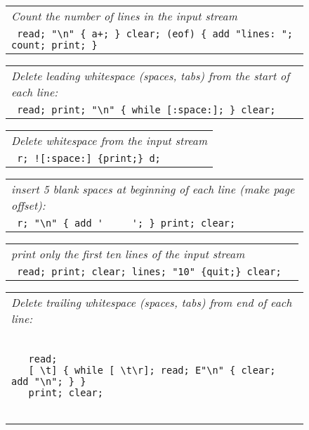 \documentclass[a4paper,12pt]{article}
\begin{document}
 \begin{figure}
 \begin{tabular}{ l }
 \emph{ Count the number of lines in the input stream } \\ 
 \verb| read; "\n" { a+; } clear; (eof) { add "lines: "; count; print; } |
 \end{tabular} 
 \end{figure}
 \begin{figure}
 \begin{tabular}{ l }
 \emph{ Delete leading whitespace (spaces, tabs) from the start of each line:  } \\ 
 \verb| read; print; "\n" { while [:space:]; } clear;  |
 \end{tabular} 
 \end{figure}
 \begin{figure}
 \begin{tabular}{ l }
 \emph{ Delete whitespace from the input stream } \\ 
 \verb| r; ![:space:] {print;} d; |
 \end{tabular} 
 \end{figure}
 \begin{figure}
 \begin{tabular}{ l }
 \emph{ insert 5 blank spaces at beginning of each line (make page offset): } \\ 
 \verb| r; "\n" { add '     '; } print; clear; |
 \end{tabular} 
 \end{figure}
 \begin{figure}
 \begin{tabular}{ l }
 \emph{ print only the first ten lines of the input stream } \\ 
 \verb| read; print; clear; lines; "10" {quit;} clear;  |
 \end{tabular} 
 \end{figure}
 \begin{figure}
 \begin{tabular}{ l }
 \emph{ Delete trailing whitespace (spaces, tabs) from end of each line:  } \\ 
 \begin{lstlisting}[breaklines] 

   read;
   [ \t] { while [ \t\r]; read; E"\n" { clear; add "\n"; } }
   print; clear;
 
 \end{lstlisting} 
 \end{tabular} 

 \end{figure}
\end{document}
